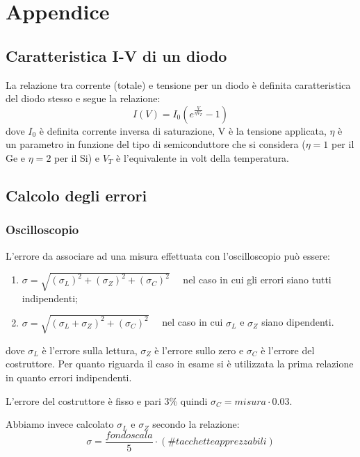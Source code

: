 \documentclass[a4paper, 11pt]{article}
\begin{document}
\newpage
\section{Appendice}

\subsection{Caratteristica I-V di un diodo} \label{sec:carIV}
La relazione tra corrente (totale) e tensione per un diodo è definita  caratteristica del diodo stesso e segue la relazione:
\begin{equation}
    I(V)=I_0 (e^{\frac{V}{\eta V_T}}-1)
    \label{eq:caratteristica IV}
\end{equation}
dove $I_0$ è definita corrente inversa di saturazione, V è la tensione applicata, $\eta$ è un parametro in funzione del tipo di semiconduttore che si considera ($\eta = 1 $ per il Ge e $\eta = 2$ per il Si) e $V_T$ è l'equivalente in volt della temperatura.

\subsection{Calcolo degli errori} \label{sec:errori}
\subsubsection{Oscilloscopio}
L'errore da associare ad una misura effettuata con l'oscilloscopio può essere:
\begin{enumerate}
    \item $\sigma = \sqrt{(\sigma_L)^2 + (\sigma_Z)^2 + (\sigma_C)^2} \quad$ nel caso in cui gli errori siano tutti indipendenti;
    \item  $\sigma = \sqrt{(\sigma_L + \sigma_Z)^2 + (\sigma_C)^2} \quad$ nel caso in cui $\sigma_L$ e $\sigma_Z$ siano dipendenti.
    \end{enumerate}
dove $\sigma_L$ è l'errore sulla lettura, $\sigma_Z$ è l'errore sullo zero e $\sigma_C$ è l'errore del costruttore. Per quanto riguarda il caso in esame si è utilizzata la prima relazione in quanto errori indipendenti.

L'errore del costruttore è fisso e pari 3\% quindi $\sigma_C = misura \cdot 0.03$.

Abbiamo invece calcolato $\sigma_L$ e $\sigma_Z$ secondo la relazione: 
\begin{equation*}
    \sigma = \frac{fondo scala}{5} \cdot ( \# tacchette apprezzabili)
\end{equation*}
\end{document}
